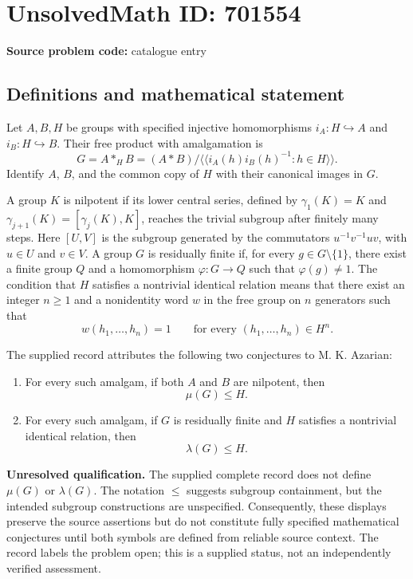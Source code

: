 \documentclass[11pt]{article}
\begin{document}
\section*{UnsolvedMath ID: 701554}
\textbf{Source problem code:} catalogue entry
\subsection{Definitions and mathematical statement}
Let \(A,B,H\) be groups with specified injective homomorphisms \(i_A:H\hookrightarrow A\) and \(i_B:H\hookrightarrow B\). Their free product with amalgamation is
\[
G=A\ast_H B=(A\ast B)/\langle\!\langle i_A(h)i_B(h)^{-1}:h\in H\rangle\!\rangle.
\]
Identify \(A\), \(B\), and the common copy of \(H\) with their canonical images in \(G\).

A group \(K\) is nilpotent if its lower central series, defined by \(\gamma_1(K)=K\) and \(\gamma_{j+1}(K)=[\gamma_j(K),K]\), reaches the trivial subgroup after finitely many steps. Here \([U,V]\) is the subgroup generated by the commutators \(u^{-1}v^{-1}uv\), with \(u\in U\) and \(v\in V\). A group \(G\) is residually finite if, for every \(g\in G\setminus\{1\}\), there exist a finite group \(Q\) and a homomorphism \(\varphi:G\to Q\) such that \(\varphi(g)\ne1\). The condition that \(H\) satisfies a nontrivial identical relation means that there exist an integer \(n\ge1\) and a nonidentity word \(w\) in the free group on \(n\) generators such that
\[
w(h_1,\ldots,h_n)=1\qquad\text{for every }(h_1,\ldots,h_n)\in H^n.
\]

The supplied record attributes the following two conjectures to M. K. Azarian:
\begin{enumerate}
\item[(a)] For every such amalgam, if both \(A\) and \(B\) are nilpotent, then
\[
\mu(G)\le H.
\]
\item[(b)] For every such amalgam, if \(G\) is residually finite and \(H\) satisfies a nontrivial identical relation, then
\[
\lambda(G)\le H.
\]
\end{enumerate}
\textbf{Unresolved qualification.} The supplied complete record does not define \(\mu(G)\) or \(\lambda(G)\). The notation \(\le\) suggests subgroup containment, but the intended subgroup constructions are unspecified. Consequently, these displays preserve the source assertions but do not constitute fully specified mathematical conjectures until both symbols are defined from reliable source context. The record labels the problem open; this is a supplied status, not an independently verified assessment.
\end{document}
